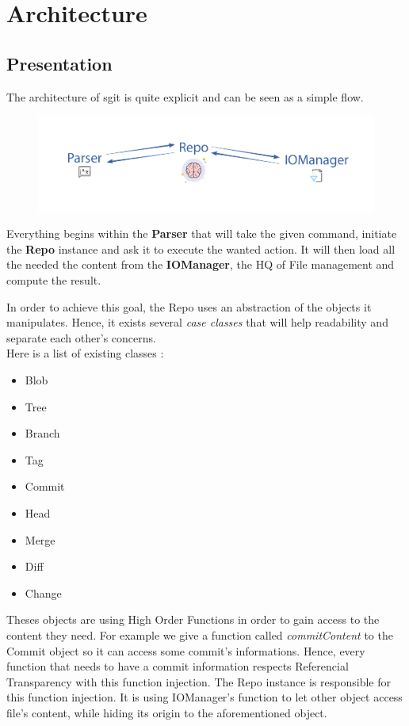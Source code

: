 \documentclass[11pt]{article}
\begin{document}
\section{Architecture}
\subsection{Presentation}
The architecture of sgit is quite explicit and can be seen as a simple flow.

\begin{figure}[h!]
  \centering
  \includegraphics[width=\linewidth]{img/flow.png}
\end{figure}

Everything begins within the \textbf{Parser} that will take the given command, initiate the \textbf{Repo} instance and ask it to execute the wanted action. It will then load all the needed the content from the \textbf{IOManager}, the HQ of File management and compute the result.

In order to achieve this goal, the Repo uses an abstraction of the objects it manipulates. Hence, it exists several \textit{case classes} that will help readability and separate each other's concerns.\\

Here is a list of existing classes :
\begin{multicols}{3}
\begin{itemize}
  \setlength\itemsep{0.1em}
  \item Blob
  \item Tree
  \item Branch
  \item Tag
  \item Commit
  \item Head
  \item Merge
  \item Diff
  \item Change
\end{itemize}
\end{multicols}

Theses objects are using High Order Functions in order to gain access to the content they need. For example we give a function called \textit{commitContent} to the Commit object so it can access some commit's informations. Hence, every function that needs to have a commit information respects Referencial Transparency with this function injection.
The Repo instance is responsible for this function injection. It is using IOManager's function to let other object access file's content, while hiding its origin to the aforementioned object.
\end{document}
